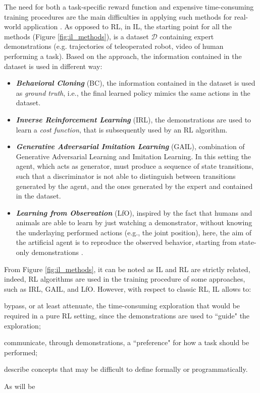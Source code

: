 
\noindent The need for both a task-specific reward function and expensive time-consuming training procedures are the main difficulties in applying such methods for real-world application
\cite{hussein2017imitation_learning_survey}. \newline As opposed to RL, in IL, the starting point for all the methods
(Figure \ref{fig:il_methods}), is a dataset $\mathcal{D}$ containing expert demonstrations (e.g. trajectories of teleoperated
robot, video of human performing a task). Based on the approach, the information contained in the dataset
is used in different way:
\begin{itemize}
    \item \textbf{\textit{Behavioral Cloning}} (BC), the information contained in the dataset is used as \textit{ground
              truth}, i.e., the final learned policy mimics the same actions in the dataset.
    \item \textbf{\textit{Inverse Reinforcement Learning}} (IRL), the demonstrations are used to learn a \textit{cost
              function}, that is subsequently used by an RL algorithm.
    \item \textbf{\textit{Generative Adversarial Imitation Learning}} (GAIL), combination of Generative Adversarial Learning and Imitation Learning. In this
          setting the agent, which acts as generator, must produce a sequence of state transitions, such that a
          discriminator is not able to distinguish between transitions generated by the agent, and the ones generated by the expert and contained in the dataset.
    \item \textbf{\textit{Learning from Observation}} (LfO), inspired by the fact that humans and animals are able to
          learn by just watching a demonstrator, without knowing the underlaying performed actions (e.g., the joint position),
          here, the aim of the artificial agent is to reproduce the observed behavior, starting from state-only demonstrations
          \cite{torabi2019recent_advances_lfo}.
\end{itemize}

\noindent From Figure \ref{fig:il_methods}, it can be noted as IL and RL are strictly related, indeed, RL algorithms are used in
the training procedure of some approaches, such as IRL, GAIL, and LfO. However, with respect to classic RL, IL allows to:
\begin{enumerate*}[label=\textbf{(\arabic*)}]
    \item bypass, or at least attenuate, the time-consuming exploration that would be required in a pure RL setting, since the demonstrations are used to ``guide" the exploration;
    \item communicate, through demonstrations, a ``preference" for how a task should be performed;
    \item describe concepts that may be difficult to define formally or programmatically. \end{enumerate*} As will be
